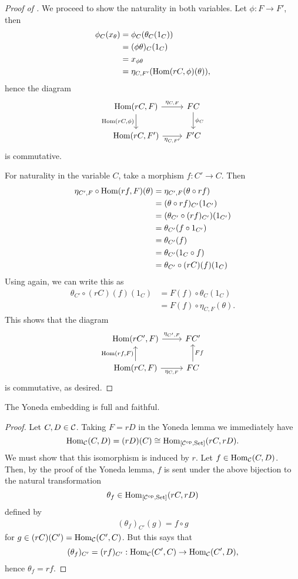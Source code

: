 \begin{proof}[Proof of ]
We proceed to show the naturality in both variables. Let $\phi:F\to F'$, then
\begin{align*}
\phi_C(x_\theta)&=\phi_C(\theta_C(1_C))\\
&= (\phi\theta)_C(1_C)\\
&= x_{\phi\theta}\\
&= \eta_{C,F'}(\operatorname{Hom}(rC,\phi)(\theta)),
\end{align*}
hence the diagram
\[\begin{tikzcd}
\Hom(rC,F)\arrow{r}{\eta_{C,F}}\arrow{d}[swap]{\Hom(rC,\phi)} & FC\arrow{d}{\phi_C}\\
\Hom(rC,F')\arrow{r}[swap]{\eta_{C,F'}} & F'C
\end{tikzcd}\]
is commutative.

For naturality in the variable $C$, take a morphism $f\colon C'\to C$. Then
\begin{align*}
\eta_{C',F}\circ\operatorname{Hom}(rf, F)(\theta) &= \eta_{C',F}(\theta\circ rf)\\
&= (\theta\circ rf)_{C'}(1_{C'})\\
&= (\theta_{C'}\circ (rf)_{C'})(1_{C'})\\
&=\theta_{C'}(f\circ1_{C'})\\
&=\theta_{C'}(f)\\
&= \theta_{C'} (1_C\circ f)\\
&=\theta_{C'}\circ(rC)(f)(1_C)
\end{align*}
Using  again, we can write this as
\begin{align*}
\theta_{C'}\circ(rC)(f)(1_C) &= F(f)\circ\theta_C(1_C)\\
&= F(f)\circ\eta_{C,F}(\theta).
\end{align*}
This shows that the diagram
\[\begin{tikzcd}
\Hom(rC',F)\arrow{r}{\eta_{C',F}} & FC'\\
\Hom(rC,F)\arrow{u}{\Hom(rf,F)}\arrow{r}[swap]{\eta_{C,F}} & FC\arrow{u}[swap]{Ff}
\end{tikzcd}\]
is commutative, as desired.
\end{proof}

\begin{corollary}
The Yoneda embedding is full and faithful.
\end{corollary}

\begin{proof}
Let $C,D\in\mathcal{C}$. Taking $F=rD$ in the Yoneda lemma we immediately have
\[
\operatorname{Hom}_{\mathcal{C}}(C,D)=(rD)(C)\cong \operatorname{Hom}_{[\mathcal{C}^{\mathrm{op}},\mathrm{Set}]}(rC,rD).
\]We must show that this isomorphism is induced by $r$. Let $f\in\operatorname{Hom}_{\mathcal{C}}(C,D)$. Then, by the proof of the Yoneda lemma, $f$ is sent under the above bijection to the natural transformation 
\[\theta_f\in\operatorname{Hom}_{[\mathcal{C}^{\mathrm{op}},\mathrm{Set}]}(rC,rD)
\]defined by
\begin{align*}
(\theta_f)_{C'}(g)=f\circ g
\end{align*}for $g\in(rC)(C')=\operatorname{Hom}_{\mathcal{C}}(C',C)$. But this says that 
\[
(\theta_f)_{C'}=(rf)_{C'}:\operatorname{Hom}_{\mathcal{C}}(C',C)\to\operatorname{Hom}_{\mathcal{C}}(C',D),
\]hence $\theta_f=rf$.
\end{proof}

